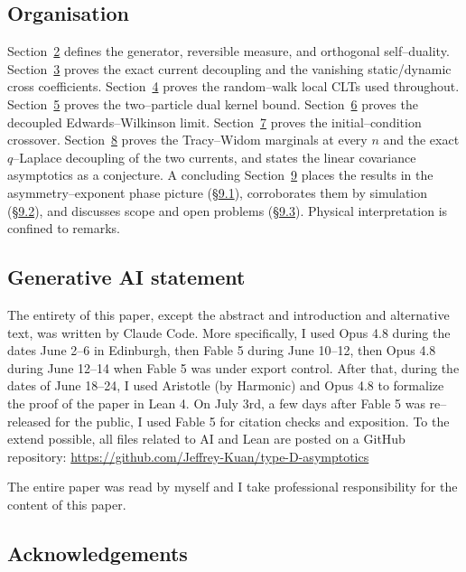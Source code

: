 \documentclass[11pt]{article}
\theoremstyle{plain}
\theoremstyle{definition}
\theoremstyle{remark}
\begin{document}
\subsection{Organisation}\label{sec_introorg}
Section~\hyperref[sec_model]{2} defines the generator, reversible measure, and orthogonal
self--duality. Section~\hyperref[sec_decouple]{3} proves the exact current decoupling and the
vanishing static/dynamic cross coefficients. Section~\hyperref[sec_lclt]{4} proves the
random--walk local CLTs used throughout. Section~\hyperref[sec_kernel]{5} proves the
two--particle dual kernel bound. Section~\hyperref[sec_ew]{6} proves the decoupled
Edwards--Wilkinson limit. Section~\hyperref[sec_cross]{7} proves the initial--condition
crossover. Section~\hyperref[sec_tw]{8} proves the Tracy--Widom marginals at every $n$ and
the exact $q$--Laplace decoupling of the two currents, and states the linear
covariance asymptotics as a conjecture. A concluding Section~\hyperref[sec_summary]{9} places the
results in the asymmetry--exponent phase picture (\S\hyperref[sec_phase]{9.1}), corroborates them
by simulation (\S\hyperref[sec_numerics]{9.2}), and discusses scope and open problems
(\S\hyperref[sec_disc]{9.3}). Physical interpretation is confined to remarks.

\subsection{Generative AI statement}
The entirety of this paper, except the abstract and introduction and alternative text, was written by Claude Code. More specifically, I used Opus 4.8 during the dates June 2--6 in Edinburgh, then Fable 5 during June 10--12, then Opus 4.8 during June 12--14 when Fable 5 was under export control. After that, during the dates of June 18--24, I used Aristotle (by Harmonic) and Opus 4.8 to formalize the proof of the paper in Lean 4. On July 3rd, a few days after Fable 5 was re--released for the public, I used Fable 5 for citation checks and exposition. To the extend possible, all files related to AI and Lean are posted on a GitHub repository: \url{https://github.com/Jeffrey-Kuan/type-D-asymptotics}

The entire paper was read by myself and I take professional responsibility for the content of this paper. 

\subsection{Acknowledgements}
\end{document}
